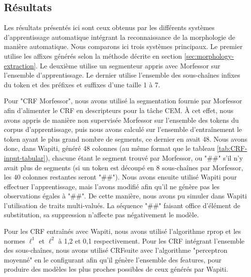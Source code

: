 \documentclass[12pt,a4paper,times,twoside,openright]{report}
\begin{document}
        
        \subsection{Résultats}
        \label{subsec:ML-morphology-results}
Les résultats présentés ici sont ceux obtenus par les différents systèmes d'apprentissage automatique intégrant la reconnaissance de la morphologie de manière automatique. Nous comparons ici trois systèmes principaux. Le premier utilise les affixes générés selon la méthode décrite en section \ref{sec:morphology-extraction}. Le deuxième utilise un segmenteur appris avec Morfessor sur l'ensemble d'apprentissage. Le dernier utilise l'ensemble des sous-chaînes infixes du token et des préfixes et suffixes d'une taille 1 à 7.

Pour "CRF Morfessor", nous avons utilisé la segmentation fournie par Morfessor afin d'alimenter le CRF en descripteurs pour la tâche CEM. À cet effet, nous avons appris de manière non supervisée Morfessor sur l'ensemble des tokens du corpus d'apprentissage, puis nous avons calculé sur l'ensemble d'entraînement le token ayant le plus grand nombre de segments, ce dernier en avait 48. Nous avons donc, dans Wapiti, généré 48 colonnes (au même format que le tableau \ref{tab:CRF-input-tabular}), chacune étant le segment trouvé par Morfessor, ou "\#\#" s'il n'y avait plus de segments (si un token est découpé en 8 sous-chaînes par Morfessor, les 40 colonnes restantes seront "\#\#"). Nous avons ensuite utilisé Wapiti pour effectuer l'apprentissage, mais l'avons modifié afin qu'il ne génère pas les observations égales à "\#\#". De cette manière, nous avons pu simuler dans Wapiti l'utilisation de traits multi-valués. La séquence "\#\#" faisant office d'élément de substitution, sa suppression n'affecte pas négativement le modèle.

Pour les CRF entraînés avec Wapiti, nous avons utilisé l'algorithme rprop et les normes $\ell^{1}$ et $\ell^{2}$ à 1,2 et 0,1 respectivement. Pour les CRF intégrant l'ensemble des sous-chaînes, nous avons utilisé CRFsuite \citep{okazaki2007crfsuite} avec l'algorithme "perceptron moyenné" en le configurant afin qu'il génère l'ensemble des features, pour produire des modèles les plus proches possibles de ceux générés par Wapiti.
\end{document}
